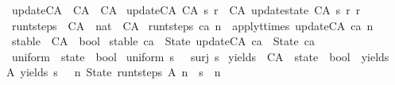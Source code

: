 \begin{isabellebody}
\isanewline
{}\isamarkupfalse%
\ update{\isacharunderscore}CA\ {\isacharcolon}{\isacharcolon}\ {\isachardoublequoteopen}CA\ {\isasymRightarrow}\ CA{\isachardoublequoteclose}\ \isanewline
{\isachardoublequoteopen}update{\isacharunderscore}CA\ {\isacharparenleft}CA\ s\ r{\isacharparenright}\ {\isacharequal}\ CA\ {\isacharparenleft}update{\isacharunderscore}state\ {\isacharparenleft}CA\ s\ r{\isacharparenright}{\isacharparenright}\ r{\isachardoublequoteclose}\isanewline
\isanewline
{}\isamarkupfalse%
\ run{\isacharunderscore}t{\isacharunderscore}steps\ {\isacharcolon}{\isacharcolon}\ {\isachardoublequoteopen}CA\ {\isasymRightarrow}\ nat\ {\isasymRightarrow}\ CA{\isachardoublequoteclose}\ \isanewline
{\isachardoublequoteopen}run{\isacharunderscore}t{\isacharunderscore}steps\ ca\ n\ {\isacharequal}\ apply{\isacharunderscore}t{\isacharunderscore}times\ update{\isacharunderscore}CA\ ca\ n{\isachardoublequoteclose}%
\isadelimdocument
%
\endisadelimdocument
%
\isatagdocument
%
\isamarkuptrue%
%
\endisatagdocument
{\isafolddocument}%
%
\isadelimdocument
%
\endisadelimdocument
{}\isamarkupfalse%
\ stable\ {\isacharcolon}{\isacharcolon}\ {\isachardoublequoteopen}CA\ {\isasymRightarrow}\ bool{\isachardoublequoteclose}\ \isanewline
{\isachardoublequoteopen}stable\ ca\ {\isasymequiv}\ State\ {\isacharparenleft}update{\isacharunderscore}CA\ ca{\isacharparenright}\ {\isacharequal}\ State\ ca{\isachardoublequoteclose}\isanewline
\isanewline
\isanewline
{}\isamarkupfalse%
\ uniform\ {\isacharcolon}{\isacharcolon}\ {\isachardoublequoteopen}state\ {\isasymRightarrow}\ bool{\isachardoublequoteclose}\ \isanewline
{\isachardoublequoteopen}uniform\ s\ {\isasymequiv}\ {\isasymnot}\ {\isacharparenleft}surj\ s{\isacharparenright}{\isachardoublequoteclose}\isanewline
\isanewline
{}\isamarkupfalse%
\ yields\ {\isacharcolon}{\isacharcolon}\ {\isachardoublequoteopen}CA\ {\isasymRightarrow}\ state\ {\isasymRightarrow}\ bool{\isachardoublequoteclose}\ {\isacharparenleft}\ {\isacartoucheopen}yields{\isacartoucheclose}\ \ {}{}{\isacharparenright}\ \isanewline
{\isachardoublequoteopen}A\ yields\ s\ {\isasymequiv}\ {\isacharparenleft}{\isasymexists}\ n{\isachardot}\ State\ {\isacharparenleft}run{\isacharunderscore}t{\isacharunderscore}steps\ A\ n{\isacharparenright}\ {\isacharequal}\ s\ {\isasymand}\ n\ {\isachargreater}\ {}{\isacharparenright}{\isachardoublequoteclose}\isanewline

\end{isabellebody}
